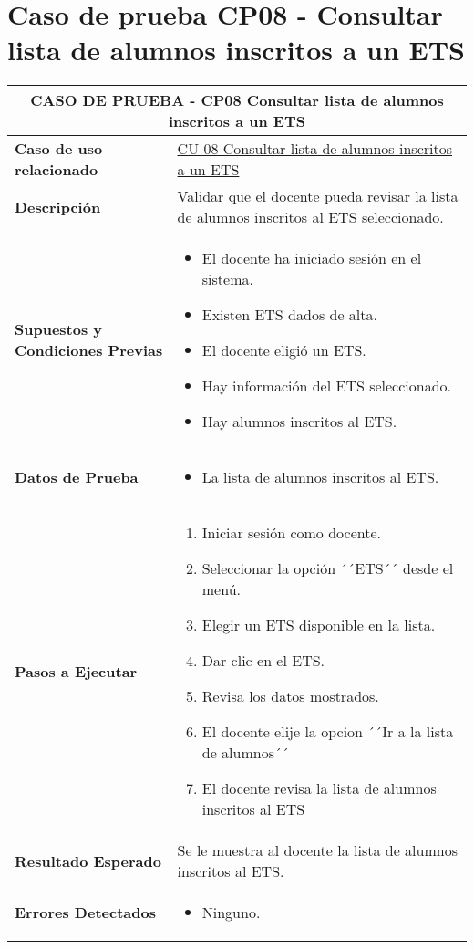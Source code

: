 \section{Caso de prueba CP08 - Consultar lista de alumnos inscritos a un ETS}

\begin{longtable}{|p{5cm}|p{10cm}|}
	\hline
	\multicolumn{2}{|c|}{\textbf{CASO DE PRUEBA - CP08 Consultar lista de alumnos inscritos a un ETS}} \\
	\hline
	\textbf{Caso de uso relacionado} & \hyperref[CU-08]{CU-08 Consultar lista de alumnos inscritos a un ETS} \\
	\hline
	\textbf{Descripción} & Validar que el docente pueda revisar la lista de alumnos inscritos al ETS seleccionado. \\
	\hline
	\textbf{Supuestos y Condiciones Previas} & 
	\begin{itemize}
		\item El docente ha iniciado sesión en el sistema.
		\item Existen ETS dados de alta.
		\item El docente eligió un ETS.
		\item Hay información del ETS seleccionado.
		\item Hay alumnos inscritos al ETS.
		
	\end{itemize} \\
	\hline
	\textbf{Datos de Prueba} & 
	\begin{itemize}
		\item La lista de alumnos inscritos al ETS.
	\end{itemize} \\
	\hline
	\textbf{Pasos a Ejecutar} & 
	\begin{enumerate}
		\item Iniciar sesión como docente.
		\item Seleccionar la opción ´´ETS´´ desde el menú.
		\item Elegir un ETS disponible en la lista.
		\item Dar clic en el ETS.
		\item Revisa los datos mostrados.
		\item El docente elije la opcion ´´Ir a la lista de alumnos´´
		\item El docente revisa la lista de alumnos inscritos al ETS
	\end{enumerate} \\
	\hline
	\textbf{Resultado Esperado} & 
	Se le muestra al docente la lista de alumnos inscritos al ETS. \\	
	\hline
	\textbf{Errores Detectados} & 
	\begin{itemize}
		\item Ninguno.
		

\end{itemize}
\end{longtable}

